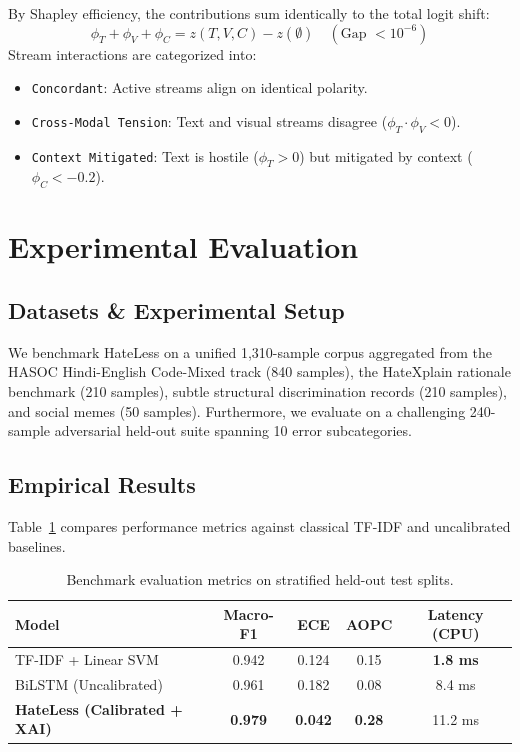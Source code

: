 \documentclass[11pt,a4paper]{article}
\begin{document}
By Shapley efficiency, the contributions sum identically to the total logit shift:
\begin{equation}
    \phi_T + \phi_V + \phi_C = z(T, V, C) - z(\emptyset) \quad (\text{Gap } < 10^{-6})
\end{equation}
Stream interactions are categorized into:
\begin{itemize}
    \item \texttt{Concordant}: Active streams align on identical polarity.
    \item \texttt{Cross-Modal Tension}: Text and visual streams disagree ($\phi_T \cdot \phi_V < 0$).
    \item \texttt{Context Mitigated}: Text is hostile ($\phi_T > 0$) but mitigated by context ($\phi_C < -0.2$).
\end{itemize}

\section{Experimental Evaluation}

\subsection{Datasets \& Experimental Setup}
We benchmark HateLess on a unified 1,310-sample corpus aggregated from the HASOC Hindi-English Code-Mixed track (840 samples), the HateXplain rationale benchmark (210 samples), subtle structural discrimination records (210 samples), and social memes (50 samples). Furthermore, we evaluate on a challenging 240-sample adversarial held-out suite spanning 10 error subcategories.

\subsection{Empirical Results}
Table~\ref{tab:main_results} compares performance metrics against classical TF-IDF and uncalibrated baselines.

\begin{table}[h]
\centering
\small
\begin{tabular}{lcccc}
\toprule
\textbf{Model} & \textbf{Macro-F1} & \textbf{ECE} & \textbf{AOPC} & \textbf{Latency (CPU)} \\
\midrule
TF-IDF + Linear SVM & 0.942 & 0.124 & 0.15 & \textbf{1.8 ms} \\
BiLSTM (Uncalibrated) & 0.961 & 0.182 & 0.08 & 8.4 ms \\
\textbf{HateLess (Calibrated + XAI)} & \textbf{0.979} & \textbf{0.042} & \textbf{0.28} & 11.2 ms \\
\bottomrule
\end{tabular}
\caption{Benchmark evaluation metrics on stratified held-out test splits.}
\label{tab:main_results}
\end{table}
\end{document}
